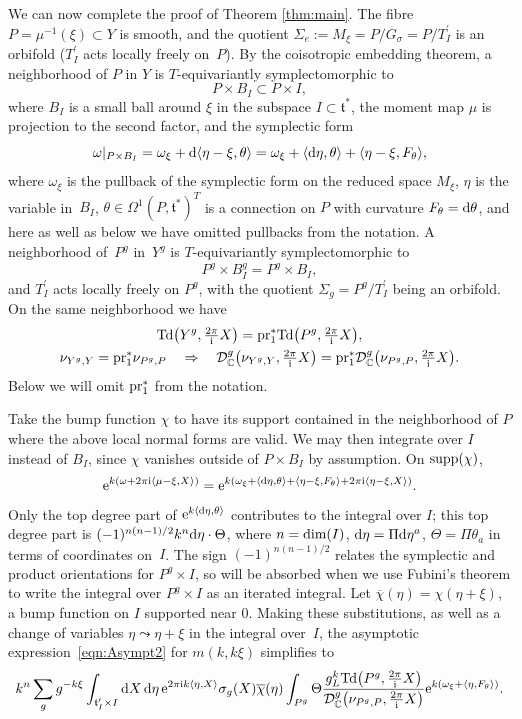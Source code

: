 \documentclass[11pt]{article}
\numberwithin{equation}{section}
\newcommand{\pair}[2]{\langle #1, #2 \rangle}
\newcommand{\ol}[1]{\overline{#1}}
\renewcommand{\i}{{\mathrm{i}}}
\def\t{\ensuremath{\mathfrak{t}}}
\def\bC{\ensuremath{\mathbb{C}}}
\def\supp{\ensuremath{\textnormal{supp}}}
\def\pr{\ensuremath{\textnormal{pr}}}
\def\dim{\ensuremath{\textnormal{dim}}}
\def\Td{\ensuremath{\textnormal{Td}}}
\def\calDC{\ensuremath{\mathcal{D}_{\bC}}}
\def\supp{\ensuremath{\textnormal{supp}}}
\begin{document}
 We can now complete the proof of Theorem \ref{thm:main}. The fibre $P=\mu^{-1}(\xi) \subset Y$ is smooth, and the quotient $\Sigma_e:=M_\xi=P/G_\sigma=P/T_I^\prime$ is an orbifold ($T_I^\prime$ acts locally freely on~$P$). By the coisotropic embedding theorem, a neighborhood of $P$ in $Y$ is $T$-equivariantly symplectomorphic to
\[ P \times B_I \subset P \times I, \]
where $B_I$ is a small ball around $\xi$ in the subspace $I \subset \t^\ast$, the moment map $\mu$ is projection to the second factor, and the symplectic form
\[ \omega|_{P\times B_I}=\omega_\xi+{\rm d}\pair{\eta-\xi}{\theta}=\omega_\xi+\pair{{\rm d}\eta}{\theta}+\pair{\eta-\xi}{F_\theta},\]
where $\omega_\xi$ is the pullback of the symplectic form on the reduced space $M_\xi$, $\eta$ is the variable in~$B_I$, $\theta \in \Omega^1(P,\t^\ast)^T$ is a connection on $P$ with curvature $F_\theta={\rm d}\theta$, and here as well as below we have omitted pullbacks from the notation. A neighborhood of~$P^g$ in~$Y^g$ is $T$-equivariantly symplectomorphic to
\[ P^g \times B_I^g=P^g \times B_I,\]
and $T_I^\prime$ acts locally freely on $P^g$, with the quotient $\Sigma_g=P^g/T_I^\prime$ being an orbifold. On the same neighborhood we have{\samepage
\begin{gather*} \Td\big(Y^g,\tfrac{2\pi}{\i}X\big)=\pr_1^\ast \Td\big(P^g,\tfrac{2\pi}{\i}X\big),\\
\nu_{Y^g,Y}=\pr_1^\ast \nu_{P^g,P} \quad \Rightarrow \quad \calDC^g\big(\nu_{Y^g,Y},\tfrac{2\pi}{\i}X\big)=\pr_1^\ast \calDC^g\big(\nu_{P^g,P},\tfrac{2\pi}{\i}X\big).
\end{gather*}
Below we will omit $\pr_1^\ast$ from the notation.}

Take the bump function $\chi$ to have its support contained in the neighborhood of $P$ where the above local normal forms are valid. We may then integrate over $I$ instead of $B_I$, since $\chi$ vanishes outside of $P\times B_I$ by assumption. On $\supp(\chi)$,
\[ {\rm e}^{k(\omega+2\pi \i\pair{\mu-\xi}{X})}={\rm e}^{k(\omega_\xi+\pair{{\rm d}\eta}{\theta}+\pair{\eta-\xi}{F_\theta}+2\pi \i\pair{\eta-\xi}{X})}.\]
Only the top degree part of ${\rm e}^{k\pair{{\rm d}\eta}{\theta}}$ contributes to the integral over $I$; this top degree part is $(-1)^{n(n-1)/2}k^n {\rm d}\eta \cdot \Theta$, where $n=\dim(I)$, ${\rm d}\eta=\Pi  {\rm d}\eta^a$, $\Theta=\Pi \theta_a$ in terms of coordinates on~$I$. The sign $(-1)^{n(n-1)/2}$ relates the symplectic and product orientations for $P^g \times I$, so will be absorbed when we use Fubini's theorem to write the integral over $P^g\times I$ as an iterated integral. Let $\ol{\chi}(\eta)=\chi(\eta+\xi)$, a bump function on $I$ supported near $0$. Making these substitutions, as well as a change of variables $\eta \leadsto \eta+\xi$ in the integral over~$I$, the asymptotic expression~\eqref{eqn:Asympt2} for $m(k,k\xi)$ simplifies to
\begin{gather*}%
k^n\sum_g g^{-k\xi} \int_{\t_I^\prime \times I} {\rm d}X\, {\rm d}\eta\,{\rm e}^{2\pi \i k\pair{\eta}{X}} \sigma_g(X)\ol{\chi}(\eta) \int_{P^g} \Theta \frac{g_L^k\Td\big(P^g,\tfrac{2\pi}{\i}X\big)}{\calDC^g\big(\nu_{P^g,P},\tfrac{2\pi}{\i}X\big)}{\rm e}^{k(\omega_\xi+\pair{\eta}{F_\theta})}.
\end{gather*}
\end{document}
